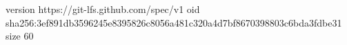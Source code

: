 version https://git-lfs.github.com/spec/v1
oid sha256:3ef891db3596245e8395826c8056a481c320a4d7bf8670398803c6bda3fdbe31
size 60
